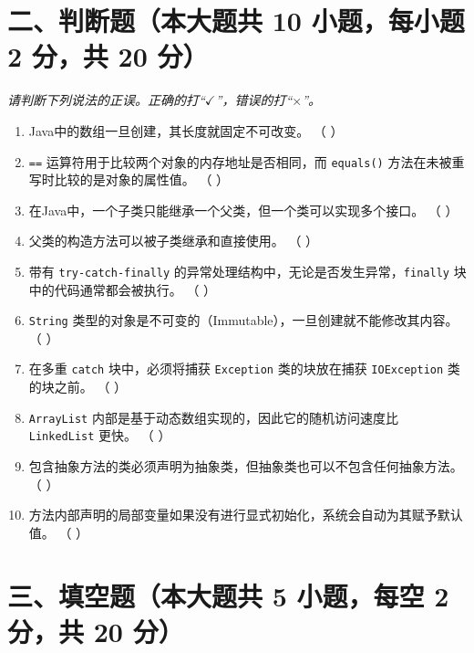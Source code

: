 \documentclass[a3paper, landscape, 11pt, twocolumn]{article}
\begin{document}
\section*{二、判断题（本大题共 10 小题，每小题 2 分，共 20 分）}
\textit{请判断下列说法的正误。正确的打“$\checkmark$”，错误的打“$\times$”。}

\begin{enumerate}[label=\arabic*., itemsep=0.8em]
	\item Java中的数组一旦创建，其长度就固定不可改变。 （ \quad ）
	\item \texttt{==} 运算符用于比较两个对象的内存地址是否相同，而 \texttt{equals()} 方法在未被重写时比较的是对象的属性值。 （ \quad ）
	\item 在Java中，一个子类只能继承一个父类，但一个类可以实现多个接口。 （ \quad ）
	\item 父类的构造方法可以被子类继承和直接使用。 （ \quad ）
	\item 带有 \texttt{try-catch-finally} 的异常处理结构中，无论是否发生异常，\texttt{finally} 块中的代码通常都会被执行。 （ \quad ）
	\item \texttt{String} 类型的对象是不可变的（Immutable），一旦创建就不能修改其内容。 （ \quad ）
	\item 在多重 \texttt{catch} 块中，必须将捕获 \texttt{Exception} 类的块放在捕获 \texttt{IOException} 类的块之前。 （ \quad ）
	\item \texttt{ArrayList} 内部是基于动态数组实现的，因此它的随机访问速度比 \texttt{LinkedList} 更快。 （ \quad ）
	\item 包含抽象方法的类必须声明为抽象类，但抽象类也可以不包含任何抽象方法。 （ \quad ）
	\item 方法内部声明的局部变量如果没有进行显式初始化，系统会自动为其赋予默认值。 （ \quad ）
\end{enumerate}


\section*{三、填空题（本大题共 5 小题，每空 2 分，共 20 分）}
\end{document}
